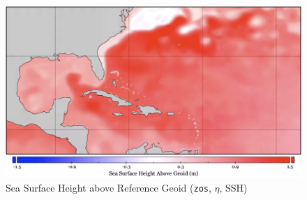 
\begin{figure}
\includegraphics[width=\linewidth]{images/example-images/zos-image.png}
Sea Surface Height above Reference Geoid (\texttt{zos}, $\eta$, SSH)
\label{fig:zos}
\end{figure}
